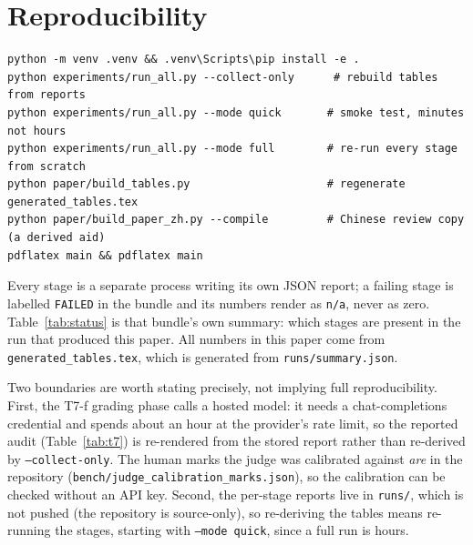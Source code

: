 \documentclass[11pt]{article}
\begin{document}
\appendix
\section{Reproducibility}

\begin{verbatim}
python -m venv .venv && .venv\Scripts\pip install -e .
python experiments/run_all.py --collect-only      # rebuild tables from reports
python experiments/run_all.py --mode quick       # smoke test, minutes not hours
python experiments/run_all.py --mode full        # re-run every stage from scratch
python paper/build_tables.py                     # regenerate generated_tables.tex
python paper/build_paper_zh.py --compile         # Chinese review copy (a derived aid)
pdflatex main && pdflatex main
\end{verbatim}

Every stage is a separate process writing its own JSON report; a failing stage is
labelled \texttt{FAILED} in the bundle and its numbers render as \texttt{n/a},
never as zero. Table~\ref{tab:status} is that bundle's own summary: which stages are
present in the run that produced this paper. All numbers in this paper come from
\texttt{generated\_tables.tex}, which is generated from \texttt{runs/summary.json}.

Two boundaries are worth stating precisely, not implying full
reproducibility. First, the T7-f grading phase calls a hosted model: it needs a
chat-completions credential and spends about an hour at the provider's rate limit,
so the reported audit (Table~\ref{tab:t7}) is re-rendered from the stored report
rather than re-derived by \texttt{--collect-only}. The human marks the judge was
calibrated against \emph{are} in the repository
(\texttt{bench/judge\_calibration\_marks.json}), so the calibration can be checked
without an API key. Second, the per-stage reports live in \texttt{runs/}, which is
not pushed (the repository is source-only), so re-deriving the tables means re-running the stages, starting with \texttt{--mode quick}, since a full run is hours.
\end{document}
